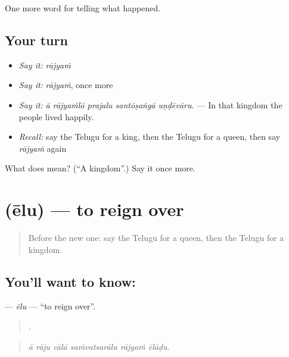\begin{grammarlens}[title={What you've built}]
One more word for telling what happened.
\end{grammarlens}

\subsection*{Your turn}
\begin{itemize}
\raggedright
  \item \emph{Say it:} \emph{rājyaṁ}
  \item \emph{Say it:} \emph{rājyaṁ}, once more
  \item \emph{Say it:} \emph{ā rājyaṁlō prajalu santōṣaṅgā uṇḍēvāru.} — In that kingdom the people lived happily.
  \item \emph{Recall:} say the Telugu for a king, then the Telugu for a queen, then say \emph{rājyaṁ} again
\end{itemize}

\begin{tcolorbox}[breakable,colback=teal!4,colframe=teal!35!black,title={Before you move on}]
What does  mean? (\textquotedblleft{}A kingdom\textquotedblright{}.) Say it once more.
\end{tcolorbox}
\section[\texorpdfstring{\te{ఏలు} (ēlu)}{ఏలు (ēlu)}]{ (ēlu) — to reign over}

\label{lesson:TE-C327-elu}



\begin{quote}
Before the new one: say the Telugu for a queen, then the Telugu for a kingdom.
\end{quote}

\subsection*{You'll want to know: }
\textbf{} — \emph{ēlu} — \textquotedblleft{}to reign over\textquotedblright{}.

\begin{quote}
     .
\end{quote}

\begin{quote}
\emph{ā rāju cālā saṁvatsarālu rājyaṁ ēlāḍu.}
\end{quote}

